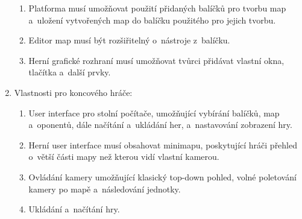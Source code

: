 \begin{enumerate}
\begin{enumerate}
			\item Platforma musí umožňovat použití přidaných balíčků pro tvorbu map a~uložení vytvořených map do balíčku použitého pro jejich tvorbu.
			\item Editor map musí být rozšiřitelný o~nástroje z~balíčku.
			\item Herní grafické rozhraní musí umožňovat tvůrci přidávat vlastní okna, tlačítka a~další prvky.
		\end{enumerate}
	\item Vlastnosti pro koncového hráče:
		\begin{enumerate}
			\item User interface pro stolní počítače, umožňující vybírání balíčků, map a~oponentů, dále načítání a~ukládání her, a~nastavování zobrazení hry.
			\item Herní user interface musí obsahovat minimapu, poskytující hráči přehled o~větší části mapy než kterou vidí vlastní kamerou.
			\item Ovládání kamery umožňující klasický top-down pohled, volné poletování kamery po mapě a~následování jednotky.
			\item Ukládání a~načítání hry.
		\end{enumerate}
\end{enumerate}
